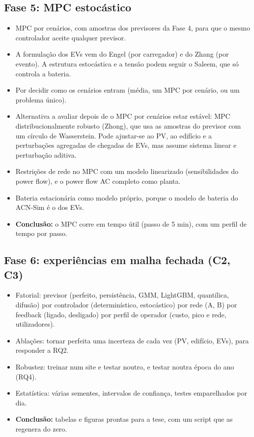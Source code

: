 \documentclass[11pt,a4paper]{article}
\begin{document}
\subsection*{Fase 5: MPC estocástico}
\begin{itemize}
  \item MPC por cenários, com amostras dos previsores da Fase 4, para que o mesmo controlador aceite qualquer previsor.
  \item A formulação dos EVs vem do Engel (por carregador) e do Zhang (por evento). A estrutura estocástica e a tensão podem seguir o Saleem, que só controla a bateria.
  \item Por decidir como os cenários entram (média, um MPC por cenário, ou um problema único).
  \item Alternativa a avaliar depois de o MPC por cenários estar estável: MPC distribucionalmente robusto (Zhong), que usa as amostras do previsor com um círculo de Wasserstein. Pode ajustar-se ao PV, ao edifício e a perturbações agregadas de chegadas de EVs, mas assume sistema linear e perturbação aditiva.
  \item Restrições de rede no MPC com um modelo linearizado (sensibilidades do power flow), e o power flow AC completo como planta.
  \item Bateria estacionária como modelo próprio, porque o modelo de bateria do ACN-Sim é o dos EVs.
  \item \textbf{Conclusão:} o MPC corre em tempo útil (passo de 5 min), com um perfil de tempo por passo.
\end{itemize}

\subsection*{Fase 6: experiências em malha fechada (C2, C3)}
\begin{itemize}
  \item Fatorial: previsor (perfeito, persistência, GMM, LightGBM, quantílica, difusão) por controlador (determinístico, estocástico) por rede (A, B) por feedback (ligado, desligado) por perfil de operador (custo, pico e rede, utilizadores).
  \item Ablações: tornar perfeita uma incerteza de cada vez (PV, edifício, EVs), para responder a RQ2.
  \item Robustez: treinar num site e testar noutro, e testar noutra época do ano (RQ4).
  \item Estatística: várias sementes, intervalos de confiança, testes emparelhados por dia.
  \item \textbf{Conclusão:} tabelas e figuras prontas para a tese, com um script que as regenera do zero.
\end{itemize}
\end{document}
